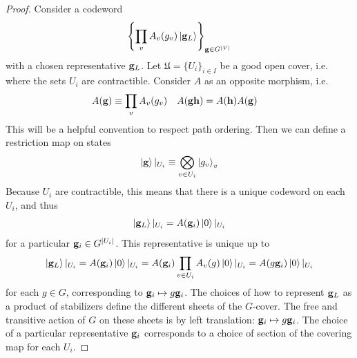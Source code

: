 \documentclass[11pt]{article}
\theoremstyle{definition}
\begin{document}
\begin{proof}
  Consider a codeword
  \begin{align}
    \left \{\prod_v A_v(g_v)\ket{\vb g_L}\right \}_{\vb g \in G^{|V|}}
  \end{align}
  with a chosen representative $\vb g_L$. Let $\mathfrak U = \{U_i\}_{i \in I}$
  be a good open cover, i.e. where the sets $U_i$ are contractible. Consider $A$ as
  an opposite morphism, i.e.
  \begin{align}
    A(\vb g) &\equiv \prod_{v} A_v(g_v) & A(\vb g \vb h) &= A(\vb h)A(\vb g)
  \end{align}
  This will be a helpful convention to respect path ordering.
  Then we can define a restriction map on states
  \begin{align}
    \ket{\vb g}|_{U_i} \equiv \bigotimes_{v \in U_i}\ket{g_v}_v
  \end{align}
  Because $U_i$ are contractible, this means that there is a unique codeword on each
  $U_i$, and thus
  \begin{align}
    \ket{\vb g_L}|_{U_i} = A(\vb g_i)\ket{0}|_{U_i}
  \end{align}
  for a particular $\vb g_i \in G^{|U_i|}$. This representative is unique up to
  \begin{align}
    \ket{\vb g_L}|_{U_i} = A(\vb g_i)\ket{0}|_{U_i} = A(\vb g_i)\prod_{v \in U_i}A_v(g)\ket{0}|_{U_i} = A(g\vb g_i)\ket{0}|_{U_i}
  \end{align}
  for each $g \in G$, corresponding to $\vb g_i \mapsto g\vb g_i$. The choices
  of how to represent $\vb g_L$ as a product of stabilizers
  define the different sheets of the $G$-cover. The free and
  transitive action of $G$ on these sheets is by left translation: $\vb g_i \mapsto
  g\vb g_i$. The choice of a particular representative $\vb g_i$
  corresponds to a choice of section of the covering map for each $U_i$.


\end{proof}
\end{document}
